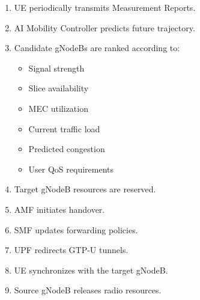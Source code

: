 \documentclass[12pt,a4paper]{article}\usepackage[a4paper,margin=1in]{geometry}\usepackage{graphicx}\usepackage{longtable}\usepackage{booktabs}\usepackage{hyperref}\usepackage{enumitem}\usepackage{amsmath}\usepackage{tikz}\usepackage{pgfgantt}\usepackage{setspace}\setstretch{1.15}\usetikzlibrary{positioning,arrows.meta,shapes.geometric}
\begin{document}
	\begin{enumerate}
		
		\item UE periodically transmits Measurement Reports.
		
		\item AI Mobility Controller predicts future trajectory.
		
		\item Candidate gNodeBs are ranked according to:
		
		\begin{itemize}
			
			\item Signal strength
			
			\item Slice availability
			
			\item MEC utilization
			
			\item Current traffic load
			
			\item Predicted congestion
			
			\item User QoS requirements
			
		\end{itemize}
		
		\item Target gNodeB resources are reserved.
		
		\item AMF initiates handover.
		
		\item SMF updates forwarding policies.
		
		\item UPF redirects GTP-U tunnels.
		
		\item UE synchronizes with the target gNodeB.
		
		\item Source gNodeB releases radio resources.
		
	\end{enumerate}
	
	
\end{document}
